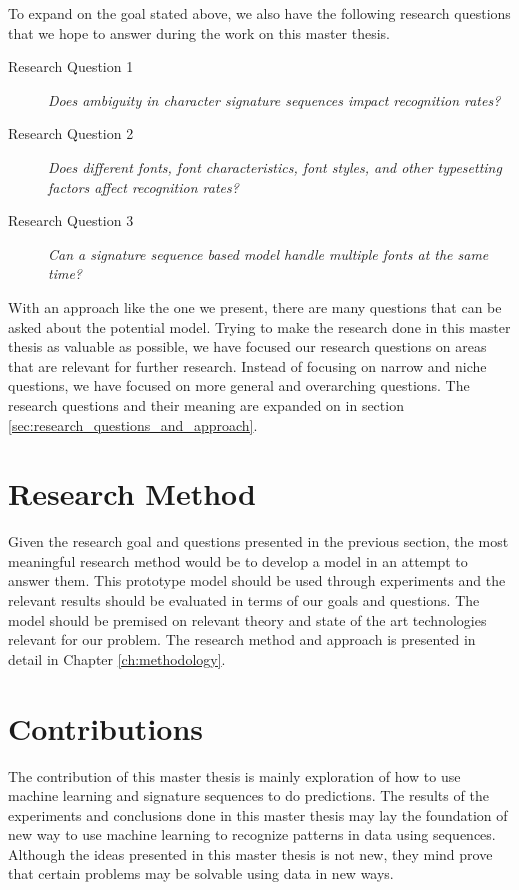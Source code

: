 To expand on the goal stated above, we also have the following research questions that we hope to answer during the work on this master thesis.

\begin{description}
    \item[Research Question 1]{\textit{Does ambiguity in character signature sequences impact recognition rates?}}
    \item[Research Question 2]{\textit{Does different fonts, font characteristics, font styles, and other typesetting factors affect recognition rates?}}
    \item[Research Question 3]{\textit{Can a signature sequence based model handle multiple fonts at the same time?}}
\end{description}

With an approach like the one we present, there are many questions that can be asked about the potential model. Trying to make the research done in this master thesis as valuable as possible, we have focused our research questions on areas that are relevant for further research. Instead of focusing on narrow and niche questions, we have focused on more general and overarching questions. The research questions and their meaning are expanded on in section \ref{sec:research_questions_and_approach}.


\section{Research Method}
Given the research goal and questions presented in the previous section, the most meaningful research method would be to develop a model in an attempt to answer them. This prototype model should be used through experiments and the relevant results should be evaluated in terms of our goals and questions. The model should be premised on relevant theory and state of the art technologies relevant for our problem. The research method and approach is presented in detail in Chapter \ref{ch:methodology}.


\section{Contributions}
The contribution of this master thesis is mainly exploration of how to use machine learning and signature sequences to do predictions. The results of the experiments and conclusions done in this master thesis may lay the foundation of new way to use machine learning to recognize patterns in data using sequences. Although the ideas presented in this master thesis is not new, they mind prove that certain problems may be solvable using data in new ways.

